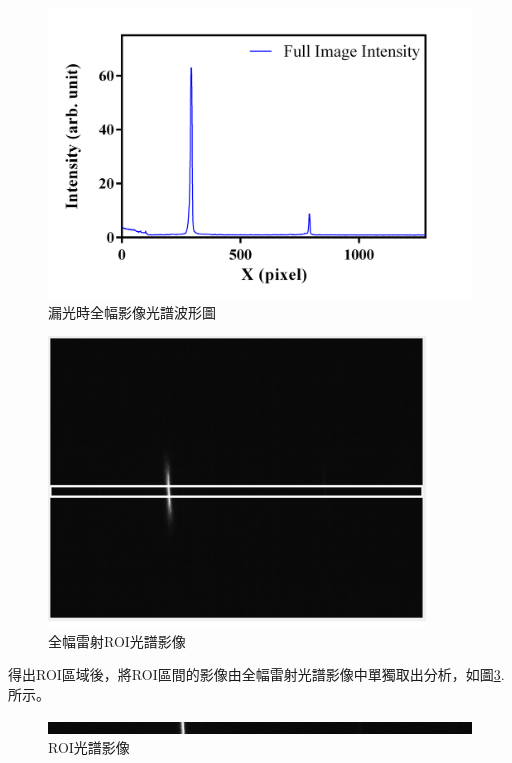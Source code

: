 \begin{figure}[H] %
	\centering %
	\setlength{\abovecaptionskip}{0.cm}
	\includegraphics[width=15cm]{figures/MissLight.png} %
	\caption{漏光時全幅影像光譜波形圖} %
	\label{漏光時全幅影像光譜波形圖} %
\end{figure}
\begin{figure}[H] %
	\centering %
	\includegraphics[width=10cm]{figures/TEST_0303_full_Image__Laser2_2021-03-03-14-23.jpg} %
	\caption{全幅雷射ROI光譜影像} %
	\label{全幅雷射ROI光譜影像} %
\end{figure}
得出ROI區域後，將ROI區間的影像由全幅雷射光譜影像中單獨取出分析，如圖\ref{ROI光譜影像}. 所示。
\begin{figure}[H] %
	\centering %
	\vspace{0.8cm}
	\includegraphics[width=13cm]{figures/TEST_0303_ROI__Laser2_2021-03-03-14-23-20.jpg} %
	\caption{ROI光譜影像} %
	\label{ROI光譜影像} %
\end{figure}
